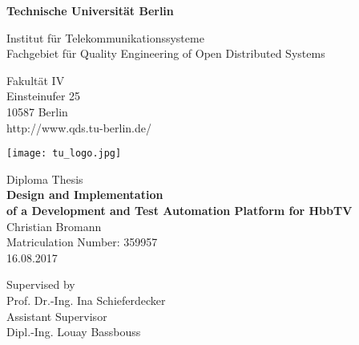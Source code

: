 \thispagestyle{empty}
\begin{center}

\vspace*{0.5cm}
{\LARGE \textbf{Technische Universität Berlin}}

\vspace{0.5cm}

{\large Institut für Telekommunikationssysteme\\[1mm]}
{\large Fachgebiet für Quality Engineering of Open Distributed Systems\\[5mm]}

Fakultät IV\\
Einsteinufer 25\\
10587 Berlin\\
http://www.qds.tu-berlin.de/\\

\vspace*{1cm}

\texttt{[image: tu\_logo.jpg]}

\vspace*{1.0cm}

{\LARGE Diploma Thesis}\\

\vspace{1.0cm}
{\LARGE \textbf{Design and Implementation}}\\
{\LARGE \textbf{of a Development and Test Automation Platform for HbbTV}}\\
\vspace*{1.0cm}
{\LARGE Christian Bromann}
\\
\vspace*{0.5cm}
Matriculation Number: 359957\\
16.08.2017\\ %
\vspace*{1.0cm}

Supervised by\\
Prof. Dr.-Ing. Ina Schieferdecker\\
\vspace*{0.5cm}
Assistant Supervisor\\
Dipl.-Ing. Louay Bassbouss
\vspace{3cm}


\end{center}
